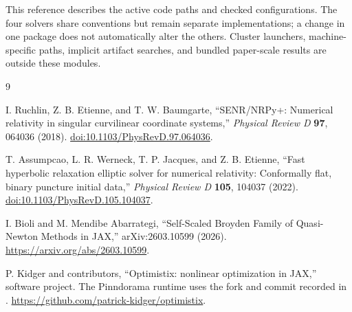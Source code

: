 \documentclass[11pt]{article}
\begin{document}
This reference describes the active code paths and checked configurations.
The four solvers share conventions but remain separate implementations; a
change in one package does not automatically alter the others.  Cluster
launchers, machine-specific paths, implicit artifact searches, and bundled
paper-scale results are outside these modules.

\begin{thebibliography}{9}

I. Ruchlin, Z. B. Etienne, and T. W. Baumgarte,
``SENR/NRPy+: Numerical relativity in singular curvilinear coordinate
systems,''
\emph{Physical Review D} \textbf{97}, 064036 (2018).
\href{https://doi.org/10.1103/PhysRevD.97.064036}
{doi:10.1103/PhysRevD.97.064036}.

T. Assumpcao, L. R. Werneck, T. P. Jacques, and Z. B. Etienne,
``Fast hyperbolic relaxation elliptic solver for numerical relativity:
Conformally flat, binary puncture initial data,''
\emph{Physical Review D} \textbf{105}, 104037 (2022).
\href{https://doi.org/10.1103/PhysRevD.105.104037}
{doi:10.1103/PhysRevD.105.104037}.

I. Bioli and M. Mendibe Abarrategi,
``Self-Scaled Broyden Family of Quasi-Newton Methods in JAX,''
arXiv:2603.10599 (2026).
\url{https://arxiv.org/abs/2603.10599}.

P. Kidger and contributors,
``Optimistix: nonlinear optimization in JAX,'' software project.
The Pinndorama runtime uses the fork and commit recorded in
.
\url{https://github.com/patrick-kidger/optimistix}.

\end{thebibliography}
\end{document}
